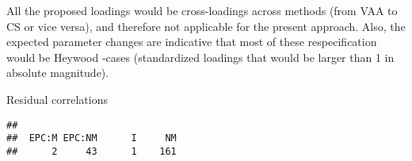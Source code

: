 \documentclass[
]{article}
\newenvironment{Shaded}{\begin{snugshade}}{\end{snugshade}}
\newcommand{\CommentTok}[1]{\textcolor[rgb]{0.56,0.35,0.01}{\textit{#1}}}
\newcommand{\DataTypeTok}[1]{\textcolor[rgb]{0.13,0.29,0.53}{#1}}
\newcommand{\DecValTok}[1]{\textcolor[rgb]{0.00,0.00,0.81}{#1}}
\newcommand{\KeywordTok}[1]{\textcolor[rgb]{0.13,0.29,0.53}{\textbf{#1}}}
\newcommand{\NormalTok}[1]{#1}
\newcommand{\OperatorTok}[1]{\textcolor[rgb]{0.81,0.36,0.00}{\textbf{#1}}}
\newcommand{\StringTok}[1]{\textcolor[rgb]{0.31,0.60,0.02}{#1}}
\begin{document}
All the proposed loadings would be cross-loadings across methods (from
VAA to CS or vice versa), and therefore not applicable for the present
approach. Also, the expected parameter changes are indicative that most
of these respecification would be Heywood -cases (standardized loadings
that would be larger than 1 in absolute magnitude).

Residual correlations

\begin{Shaded}
\end{Shaded}

\begin{verbatim}
## 
##  EPC:M EPC:NM      I     NM 
##      2     43      1    161
\end{verbatim}
\end{document}
